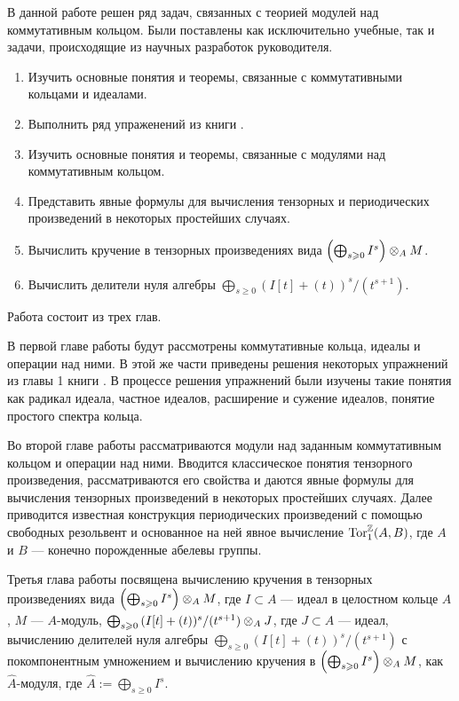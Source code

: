 В данной работе решен ряд задач, связанных с теорией модулей над коммутативным кольцом.
Были поставлены как исключительно учебные, так и задачи, происходящие из научных разработок руководителя.
\begin{enumerate}
    \item Изучить основные понятия и теоремы, связанные с коммутативными кольцами и идеалами.
    \item Выполнить ряд упраженений из книги \cite{A-M}.
    \item Изучить основные понятия и теоремы, связанные с модулями над коммутативным кольцом.
    \item Представить явные формулы для вычисления тензорных и периодических произведений в некоторых 
          простейших случаях.
    \item Вычислить кручение в тензорных произведениях вида $\left(\bigoplus_{s \geqslant 0} I^s \right) \otimes_A M$.
    \item Вычислить делители нуля алгебры $\bigoplus_{s \geq 0}{(I[t] + (t))^s / (t^{s + 1})}$.
\end{enumerate}
Работа состоит из трех глав.

В первой главе работы будут рассмотрены коммутативные кольца, идеалы и операции над ними. В этой же части приведены решения некоторых упражнений из главы 1 книги \cite{A-M}. В процессе 
решения упражнений были изучены такие понятия как радикал идеала, частное идеалов, расширение и сужение идеалов, понятие простого спектра кольца.

Во второй главе работы рассматриваются модули над заданным коммутативным кольцом и операции над ними. 
Вводится классическое понятия тензорного произведения, рассматриваются его свойства и даются 
явные формулы для вычисления тензорных произведений в некоторых простейших случаях. 
Далее приводится известная конструкция периодических произведений с помощью свободных резольвент и 
основанное на ней явное вычисление $\textup{Tor}_1^{\mathbb{Z}}(A, B)$, где $A$ и $B$ --- конечно порожденные абелевы группы.

Третья глава работы посвящена вычислению кручения в тензорных произведениях вида
$\left(\bigoplus_{s \geqslant 0} I^s \right) \otimes_A M$, где $I \subset A$ --- идеал в целостном кольце $A$, $M$ ---
$A$-модуль, $\bigoplus_{s \geqslant 0}{(I[t] + (t))^s / (t^{s + 1})} \otimes_A J$, где $J \subset A$ --- идеал,
вычислению делителей нуля алгебры $\bigoplus_{s \geq 0}{(I[t] + (t))^s / (t^{s + 1})}$ с покомпонентным
умножением и вычислению кручения в $\left(\bigoplus_{s \geqslant 0} I^s \right) \otimes_A M$, как $\hat A$-модуля,
где $\hat A := \bigoplus_{s \ge 0} I^s$.
